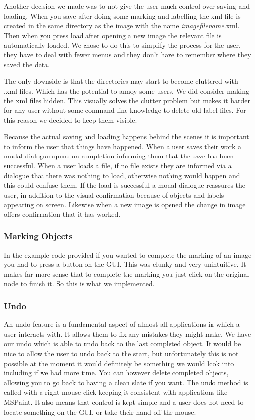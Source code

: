\documentclass[a4paper,11pt,oneside]{article}
\begin{document}
Another decision we made was to not give the user much control over saving and
loading.  When you save after doing some marking and labelling the xml file is
created in the same directory as the image with the name
\emph{imagefilename}.xml.  Then when you press load after opening a new image
the relevant file is automatically loaded.  We chose to do this to simplify the
process for the user, they have to deal with fewer menus and they don't have to
remember where they saved the data.

The only downside is that the directories may start to become cluttered with
.xml files.  Which has the potential to annoy some users.  We did consider
making the xml files hidden.  This visually solves the clutter problem but
makes it harder for any user without some command line knowledge to delete old
label files.  For this reason we decided to keep them visible.

Because the actual saving and loading happens behind the scenes it is important
to inform the user that things have happened.  When a user saves their work a
modal dialogue opens on completion informing them that the save has been
successful. When a user loads a file, if no file exists they are informed via a
dialogue that there was nothing to load, otherwise nothing would happen and this
could confuse them.  If the load is successful a modal dialogue reassures the
user, in addition to the visual confirmation because of objects and
labels appearing on screen. Likewise when a new image is opened the change in
image offers confirmation that it has worked.

\subsubsection{Marking Objects}
In the example code provided if you wanted to complete the marking of an image
you had to press a button on the GUI.  This was clunky and very unintuitive.  It
makes far more sense that to complete the marking you just click on the original
node to finish it.  So this is what we implemented.

\subsubsection{Undo}
An undo feature is a fundamental aspect of almost all applications in which
a user interacts with.  It allows them to fix any mistakes they might make.  We
have our undo which is able to undo back to the last completed object.  It would
be nice to allow the user to undo back to the start, but unfortunately this is
not possible at the moment it would definitely be something we would look into 
including if we had more time.  You can however delete completed objects, 
allowing you to go back to having a clean slate if you want.  The undo method
is called with a right mouse click keeping it consistent with applications like
MSPaint.  It also means that control is kept simple and a user does not need
to locate something on the GUI, or take their hand off the mouse.
\end{document}
